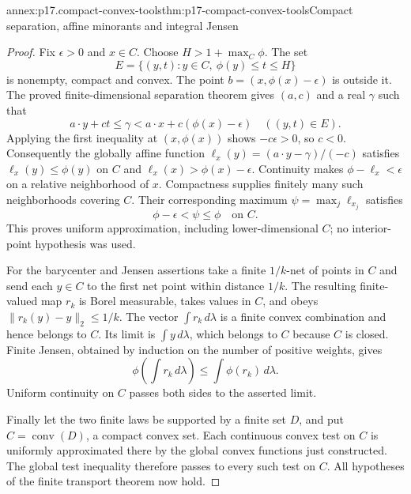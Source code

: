 
\begin{annexitem}{annex:p17.compact-convex-tools}{thm:p17-compact-convex-tools}{Compact separation, affine minorants and integral Jensen}
\begin{proof}
Fix \(\epsilon>0\) and \(x\in C\). Choose
\(H>1+\max_C\phi\). The set
\[
                   E=\{(y,t):y\in C,\ \phi(y)\leq t\leq H\}
\]
is nonempty, compact and convex. The point
\(b=(x,\phi(x)-\epsilon)\) is outside it.
The proved finite-dimensional separation theorem gives
\((a,c)\) and a real \(\gamma\) such that
\[
             a\cdot y+ct\leq\gamma
                    <a\cdot x+c(\phi(x)-\epsilon)
                                      \quad((y,t)\in E).
\]
Applying the first inequality at \((x,\phi(x))\) shows
\(-c\epsilon>0\), so \(c<0\).
Consequently the globally affine function
\(\ell_x(y)=(a\cdot y-\gamma)/(-c)\) satisfies
\(\ell_x(y)\leq\phi(y)\) on \(C\) and
\(\ell_x(x)>\phi(x)-\epsilon\).
Continuity makes \(\phi-\ell_x<\epsilon\) on a relative neighborhood
of \(x\). Compactness supplies finitely many such neighborhoods
covering \(C\). Their corresponding maximum
\(\psi=\max_j\ell_{x_j}\) satisfies
\[
                           \phi-\epsilon<\psi\leq\phi
                                                   \quad\text{on }C.
\]
This proves uniform approximation, including lower-dimensional \(C\);
no interior-point hypothesis was used.

For the barycenter and Jensen assertions take a finite \(1/k\)-net
of points in \(C\) and send each \(y\in C\) to the first net point
within distance \(1/k\). The resulting finite-valued map \(r_k\)
is Borel measurable, takes values in \(C\), and obeys
\(\|r_k(y)-y\|_2\leq1/k\).
The vector \(\int r_k\,d\lambda\) is a finite convex combination
and hence belongs to \(C\). Its limit is \(\int y\,d\lambda\),
which belongs to \(C\) because \(C\) is closed.
Finite Jensen, obtained by induction on the number of positive weights,
gives
\[
        \phi\left(\int r_k\,d\lambda\right)\leq\int\phi(r_k)\,d\lambda.
\]
Uniform continuity on \(C\) passes both sides to the asserted limit.

Finally let the two finite laws be supported by a finite set \(D\),
and put \(C=\operatorname{conv}(D)\), a compact convex set.
Each continuous convex test on \(C\) is uniformly approximated there
by the global convex functions just constructed. The global test
inequality therefore passes to every such test on \(C\).
All hypotheses of the finite transport theorem now hold.
\end{proof}
\end{annexitem}

